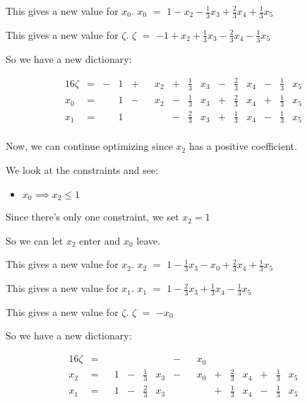 \documentclass[12pt,letterpaper]{article}
\newcommand*\continueopt[1]{
  Now, we can continue optimizing since #1 has a positive coefficient.
}
\newcommand*\enterleave[2]{
  So we can let #1 enter and #2 leave.
}
\newcommand*\newdict{
  So we have a new dictionary:
}
\newcommand*\newvalue[2]{
  This gives a new value for #1. #1 $ = $ #2
}
\begin{document}
\begin{enumerate}
      \newvalue{$x_0$}{$1 - x_2 - \frac{1}{3}x_3 + \frac{2}{3}x_4 + \frac{1}{3}x_5$}

      \newvalue{$\zeta$}{$-1 + x_2 + \frac{1}{3}x_3 - \frac{2}{3}x_4 - \frac{1}{3}x_5$}

      \newdict

      \begin{alignat*}{16}
        \zeta & {}={} & {}-{} & 1 & {}+{} &   & x_2 & {}+{} & \frac{1}{3} & x_3 & {}-{} & \frac{2}{3} & x_4 & {}-{} & \frac{1}{3} & x_5 \\
        x_0   & {}={} &       & 1 & {}-{} &   & x_2 & {}-{} & \frac{1}{3} & x_3 & {}+{} & \frac{2}{3} & x_4 & {}+{} & \frac{1}{3} & x_5 \\
        x_1   & {}={} &       & 1 &       &   &     & {}-{} & \frac{2}{3} & x_3 & {}+{} & \frac{1}{3} & x_4 & {}-{} & \frac{1}{3} & x_5 \\
      \end{alignat*}

      \continueopt{$x_2$}

      We look at the constraints and see:
      \begin{itemize}
        \item $x_0 \implies x_2 \leq 1$
      \end{itemize}

      Since there's only one constraint, we set $x_2 = 1$

      \enterleave{$x_2$}{$x_0$}

      \newvalue{$x_2$}{$1 - \frac{1}{3}x_3 - x_0 + \frac{2}{3}x_4 + \frac{1}{3}x_5$}

      \newvalue{$x_1$}{$1 - \frac{2}{3}x_3 + \frac{1}{3}x_4 - \frac{1}{3}x_5$}

      \newvalue{$\zeta$}{$-x_0$}

      \newdict

      \begin{alignat*}{16}
        \zeta & {}={} &   &   &       &             &     & {}-{} &   & x_0 &       &             &     &       &             &     \\
        x_2   & {}={} &   & 1 & {}-{} & \frac{1}{3} & x_3 & {}-{} &   & x_0 & {}+{} & \frac{2}{3} & x_4 & {}+{} & \frac{1}{3} & x_5 \\
        x_1   & {}={} &   & 1 & {}-{} & \frac{2}{3} & x_3 &       &   &     & {}+{} & \frac{1}{3} & x_4 & {}-{} & \frac{1}{3} & x_5 \\
      \end{alignat*}


\end{enumerate}
\end{document}

